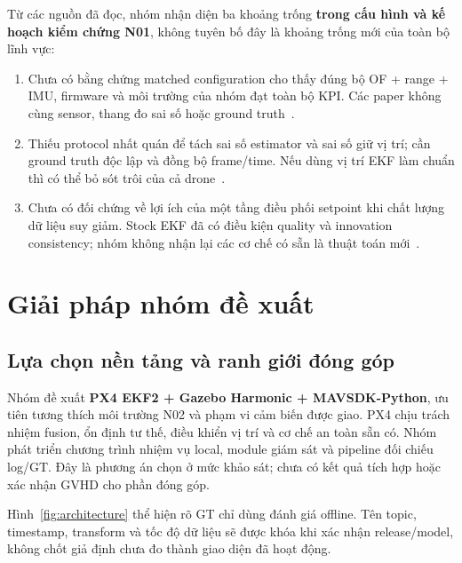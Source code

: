 \documentclass[a4paper,12pt]{article}
\begin{document}
Từ các nguồn đã đọc, nhóm nhận diện ba khoảng trống \textbf{trong cấu hình và kế hoạch kiểm chứng N01}, không tuyên bố đây là khoảng trống mới của toàn bộ lĩnh vực:
\begin{enumerate}
\item Chưa có bằng chứng matched configuration cho thấy đúng bộ OF + range + IMU, firmware và môi trường của nhóm đạt toàn bộ KPI. Các paper không cùng sensor, thang đo sai số hoặc ground truth~\cite{source4,source5,source7}.
\item Thiếu protocol nhất quán để tách sai số estimator và sai số giữ vị trí; cần ground truth độc lập và đồng bộ frame/time. Nếu dùng vị trí EKF làm chuẩn thì có thể bỏ sót trôi của cả drone~\cite{source4,source6}.
\item Chưa có đối chứng về lợi ích của một tầng điều phối setpoint khi chất lượng dữ liệu suy giảm. Stock EKF đã có điều kiện quality và innovation consistency; nhóm không nhận lại các cơ chế có sẵn là thuật toán mới~\cite{source3}.
\end{enumerate}

\section{Giải pháp nhóm đề xuất}
\subsection{Lựa chọn nền tảng và ranh giới đóng góp}
Nhóm đề xuất \textbf{PX4 EKF2 + Gazebo Harmonic + MAVSDK-Python}, ưu tiên tương thích môi trường N02 và phạm vi cảm biến được giao. PX4 chịu trách nhiệm fusion, ổn định tư thế, điều khiển vị trí và cơ chế an toàn sẵn có. Nhóm phát triển chương trình nhiệm vụ local, module giám sát và pipeline đối chiếu log/GT. Đây là phương án chọn ở mức khảo sát; chưa có kết quả tích hợp hoặc xác nhận GVHD cho phần đóng góp.

Hình~\ref{fig:architecture} thể hiện rõ GT chỉ dùng đánh giá offline. Tên topic, timestamp, transform và tốc độ dữ liệu sẽ được khóa khi xác nhận release/model, không chốt giả định chưa đo thành giao diện đã hoạt động.
\end{document}

